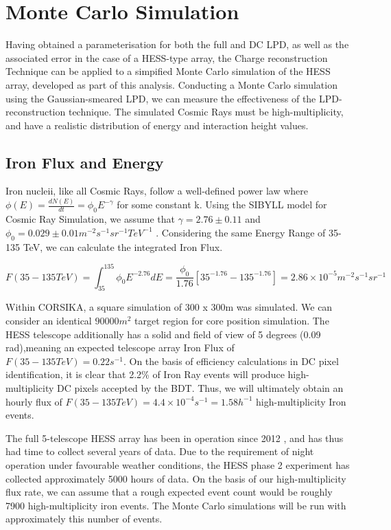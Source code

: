 \documentclass{article}
\begin{document}
\section{Monte Carlo Simulation}
Having obtained a parameterisation for both the full and DC LPD, as well as the associated error in the case of a HESS-type array, the Charge reconstruction Technique can be applied to a simpified Monte Carlo simulation of the HESS array, developed as part of this analysis. Conducting a Monte Carlo simulation using the Gaussian-smeared LPD, we can measure the effectiveness of the LPD-reconstruction technique. The simulated Cosmic Rays must be high-multiplicity, and have a realistic distribution of energy and interaction height values.

\subsection{Iron Flux and Energy}
Iron nucleii, like all Cosmic Rays, follow a well-defined power law where $\phi(E) = \frac{dN(E)}{dt} = \phi_{0} E^{-\gamma} $ for some constant k. Using the SIBYLL model for Cosmic Ray Simulation, we assume that $ \gamma = 2.76 \pm 0.11 $ and $\phi_{0}=0.029 \pm 0.01 m^{-2} s^{-1} sr^{-1} TeV ^{-1}$ \cite{hess07}. Considering the same Energy Range of 35-135 TeV, we can calculate the integrated Iron Flux. 

\[ F(35-135TeV) = \int_{35}^{135} \phi_{0} E^{-2.76} dE = \frac{\phi_{0}}{1.76}[35^{-1.76} - 135^{-1.76}] = 2.86 \times 10^{-5} m^{-2} s^{-1} sr^{-1}\]

Within CORSIKA, a square simulation of 300 x 300m was simulated. We can consider an identical $90000 m^{2}$ target region for core position simulation. The HESS telescope additionally has a solid and field of view of 5 degrees (0.09 rad),meaning an expected telescope array Iron Flux of $F(35-135TeV) = 0.22 s^{-1}$. On the basis of efficiency calculations in DC pixel identification, it is clear that 2.2\% of Iron Ray events will produce high-multiplicity DC pixels accepted by the BDT. Thus, we will ultimately obtain an hourly flux of $F(35-135TeV) = 4.4 \times 10^{-4} s^{-1} = 1.58 h^{-1}$ high-multiplicity Iron events. 

The full 5-telescope HESS array has been in operation since 2012 \cite{hessCT5}, and has thus had time to collect several years of data. Due to the requirement of night operation under favourable weather conditions, the HESS phase 2 experiment has collected approximately 5000 hours of data. On the basis of our high-multiplicity flux rate, we can assume that a rough expected event count would be roughly 7900 high-multiplicity iron events. The Monte Carlo simulations will be run with approximately this number of events.
\end{document}
